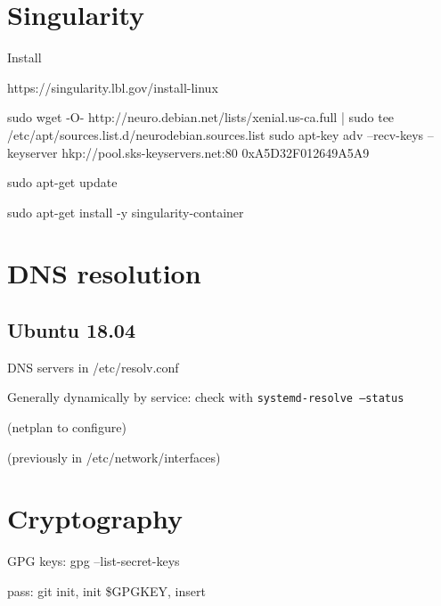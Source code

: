 \section*{Singularity}

Install

https://singularity.lbl.gov/install-linux

sudo wget -O- http://neuro.debian.net/lists/xenial.us-ca.full | sudo tee /etc/apt/sources.list.d/neurodebian.sources.list
sudo apt-key adv --recv-keys --keyserver hkp://pool.sks-keyservers.net:80 0xA5D32F012649A5A9

sudo apt-get update

sudo apt-get install -y singularity-container



\section*{DNS resolution}

\subsection*{Ubuntu 18.04}

DNS servers in /etc/resolv.conf

Generally dynamically by service: check with \texttt{systemd-resolve --status}

(netplan to configure) 

(previously in /etc/network/interfaces)


\section*{Cryptography}

GPG keys: gpg --list-secret-keys

pass: git init, init \$GPGKEY, insert










